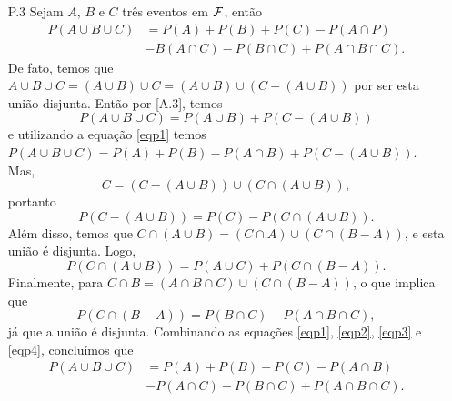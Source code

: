 \begin{frame}
\begin{enumerate}
\item[P.3]  Sejam $A$, $B$ e $C$ três eventos em ${\cal F}$, então 
$$
\begin{aligned}
P(A\cup B\cup C) & = P(A)+P(B)+P(C)-P(A\cap P) \\ &-B(A\cap C)-P(B\cap C)+P(A\cap B\cap C).
\end{aligned}
$$ 
De fato, temos que $A\cup B\cup C=(A\cup B)\cup C=(A\cup B)\cup (C - (A\cup B))$ por ser esta união disjunta. Então por [A.3], temos 
\begin{equation}
\label{eqp1}
P(A\cup B\cup C)=P(A\cup B)+P(C - (A\cup B)) 
\end{equation} 
e utilizando a equação \eqref{eqp1} temos 
$P(A\cup B\cup C)=P(A)+P(B)-P(A\cap B)+P(C - (A\cup B)).$ Mas, $$ C=(C - (A\cup B))\cup(C\cap(A\cup B)),$$ portanto \begin{equation}
\label{eqp2}
P(C - (A\cup B))=P(C)-P(C\cap(A\cup B)).
\end{equation}	
Além disso, temos que $ C\cap (A\cup B)=(C\cap A)\cup (C\cap(B -  A)) $, e esta união é disjunta. Logo,  
\begin{equation}
\label{eqp3}
P(C\cap (A\cup B))=P(A\cup C)+P(C\cap(B - A)).
\end{equation} 	
Finalmente, para $ C\cap B = (A\cap B\cap C)\cup (C\cap(B - A)) $, o que implica que 
\begin{equation}
\label{eqp4}
P(C\cap(B - A))=P(B\cap C) - P(A\cap B\cap C),
\end{equation} 		
já que a união é disjunta. Combinando as equações \eqref{eqp1}, \eqref{eqp2}, \eqref{eqp3} e \eqref{eqp4}, concluímos que 
\[
\begin{aligned}
P(A\cup B\cup C)&=P(A)+P(B)+P(C) - P(A\cap B) \\ & - P(A\cap C)  - P(B\cap C)  +P(A\cap B\cap C).
\end{aligned}
\]
\end{enumerate}
 \end{frame}

